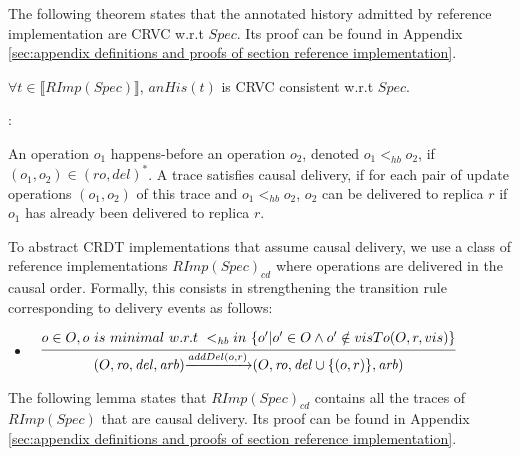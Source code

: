 The following theorem states that the annotated history admitted by reference implementation are CRVC w.r.t $Spec$. Its proof can be found in Appendix \ref{sec:appendix definitions and proofs of section reference implementation}.

\begin{theorem}
\label{theorem:executions of reference implementation are SRV consistent}
$\forall t \in \llbracket RImp(Spec) \rrbracket$, $anHis(t)$ is CRVC consistent w.r.t $Spec$.
\end{theorem}


:

An operation $o_1$ happens-before \cite{Lamport:1978} an operation $o_2$, denoted $o_1 <_{\mathit{hb}} o_2$, if $(o_1,o_2) \in (\mathit{ro},\mathit{del})^*$. A trace satisfies causal delivery, if for each pair of update operations $(o_1,o_2)$ of this trace and $o_1 <_{\mathit{hb}} o_2$, $o_2$ can be delivered to replica $r$ if $o_1$ has already been delivered to replica $r$.

To abstract CRDT implementations that assume causal delivery, we use a class of reference implementations $RImp(Spec)_{\mathit{cd}}$ where operations are delivered in the causal order. Formally, this consists in strengthening the transition rule corresponding to delivery events as follows:


\begin {itemize}
\setlength{\itemsep}{0.5pt}
\item[-] $\begin{array}{l c} \bigfrac{o \in O, o \ is \ minimal \ w.r.t \ <_{\mathit{hb}} in \ \{ o' \vert o' \in O \wedge o' \notin visTo(O,r,vis) \}} {(O,\mathit{ro},\mathit{del},\mathit{arb}) {\xrightarrow{addDel(o,r)}} (O,\mathit{ro},\mathit{del} \cup \{ (o,r) \},\mathit{arb})} \end{array}$
\end{itemize}

The following lemma states that $RImp(Spec)_{\mathit{cd}}$ contains all the traces of $RImp(Spec)$ that are causal delivery. Its proof can be found in Appendix \ref{sec:appendix definitions and proofs of section reference implementation}.

